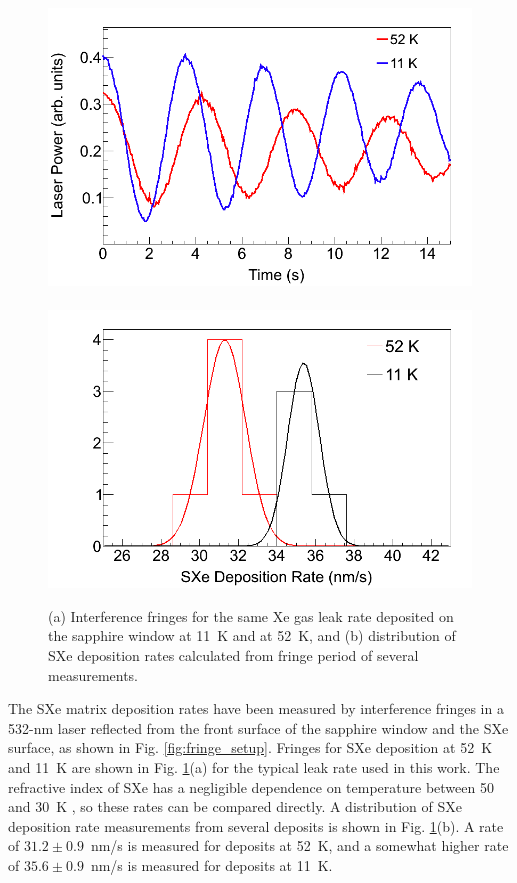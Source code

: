 \begin{figure} %
        \centering
                \includegraphics[width=.5\textwidth]{figures/fringes_52K_vs_11K.png}
                ~
                \includegraphics[width=.5\textwidth]{figures/fringes_52K_vs_11K_statistics.png}
                \caption{(a) Interference fringes for the same Xe gas leak rate deposited on the sapphire window at 11~K and at 52~K, and (b) distribution of SXe deposition rates calculated from fringe period of several measurements.}
\label{fig:fringes_52K_vs_11K}
\end{figure}

The SXe matrix deposition rates have been measured by interference fringes in a 532-nm laser reflected from the front surface of the sapphire window and the SXe surface, as shown in Fig. \ref{fig:fringe_setup}.  Fringes for SXe deposition at 52~K and 11~K are shown in Fig. \ref{fig:fringes_52K_vs_11K}(a) for the typical leak rate used in this work.  The refractive index of SXe has a negligible dependence on temperature between 50~ and 30~K \cite{SXeIndex}, so these rates can be compared directly.  A distribution of SXe deposition rate measurements from several deposits is shown in Fig. \ref{fig:fringes_52K_vs_11K}(b).  A rate of $31.2 \pm 0.9$~nm/s is measured for deposits at 52~K, and a somewhat higher rate of $35.6 \pm 0.9$~nm/s is measured for deposits at 11~K.


